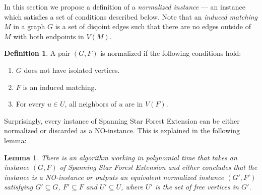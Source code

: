\documentclass[en]{pracamgr}
\newtheorem{lemma}{Lemma}
\theoremstyle{definition}
\newtheorem{definition}{Definition}
\newcommand{\ssfep}{{\sc Spanning Star Forest Extension}}
\begin{document}
In this section we propose a definition of a \emph{normalized instance} --- an instance which satisfies a set of conditions described below. Note that an \emph{induced matching} $M$ in a graph $G$ is a set of disjoint edges such that there are no edges outside of $M$ with both endpoints in $V(M)$.

\begin{definition}\label{norm-ssfe}
	A pair $(G,F)$ is normalized if the following conditions hold:
	\begin{enumerate}
		\item $G$ does not have isolated vertices.
		\item $F$ is an induced matching.
		\item For every $u \in U$, all neighbors of $u$ are in $V(F)$.
	\end{enumerate}
\end{definition}

Surprisingly, every instance of \ssfep{} can be either normalized or discarded as a NO-instance. This is explained in the following lemma:

\begin{lemma}
	There is an algorithm working in polynomial time that takes an instance $(G,F)$ of \ssfep{} and either concludes that the instance is a NO-instance or outputs an equivalent normalized instance $(G',F')$ satisfying $G' \subseteq G$,  $F' \subseteq F$ and $U' \subseteq U$, where $U'$ is the set of free vertices in $G'$.
\end{lemma}
\end{document}
